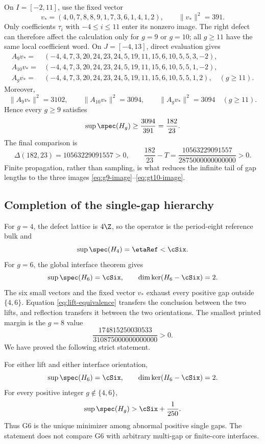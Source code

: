 On \(I=[-2,11]\), use the fixed vector
\begin{equation}
 v_*=(4,0,7,8,8,9,1,7,3,6,1,4,1,2),
 \qquad \|v_*\|^2=391.
 \label{eq:vstar}
\end{equation}
Only coefficients \(\tau_i\) with \(-4\leq i\leq11\) enter its nonzero
image.  The right defect can therefore affect the calculation only for
\(g=9\) or \(g=10\); all \(g\geq11\) have the same local coefficient word.
On \(J=[-4,13]\), direct evaluation gives
\begin{align}
 A_9v_*={}&(-4,4,7,3,20,24,23,24,5,19,11,15,6,10,5,5,3,-2),
 \label{eq:g9-image}\\
 A_{10}v_*={}&(-4,4,7,3,20,24,23,24,5,19,11,15,6,10,5,5,1,-2),
 \label{eq:g10-image}\\
 A_gv_*={}&(-4,4,7,3,20,24,23,24,5,19,11,15,6,10,5,5,1,2),
 \quad(g\geq11). \label{eq:gt10-image}
\end{align}
Moreover,
\[
\|A_9v_*\|^2=3102,\qquad
\|A_{10}v_*\|^2=3094,\qquad
\|A_gv_*\|^2=3094\quad(g\geq11).
\]
Hence every \(g\geq9\) satisfies
\begin{equation}
 \sup\spec(H_g)\geq\frac{3094}{391}=\frac{182}{23}.
\end{equation}
The final comparison is
\begin{equation}
 \Delta(182,23)=10563229091557>0,
 \qquad
 \frac{182}{23}-T=
 \frac{10563229091557}{2875000000000000}>0.
 \label{eq:tail-margin}
\end{equation}
Finite propagation, rather than sampling, is what reduces the infinite tail
of gap lengths to the three images \eqref{eq:g9-image}--\eqref{eq:gt10-image}.

\subsection{Completion of the single-gap hierarchy}

For \(g=4\), the defect lattice is \(4\Z\), so the operator is the
period-eight reference bulk and
\begin{equation}
 \sup\spec(H_4)=\etaRef<\cSix.
\end{equation}
For \(g=6\), the global interface theorem gives
\begin{equation}
 \sup\spec(H_6)=\cSix,\qquad
 \dim\ker(H_6-\cSix)=2.
\end{equation}
The six small vectors and the fixed vector \(v_*\) exhaust every positive
gap outside \(\{4,6\}\).  Equation \eqref{eq:lift-equivalence} transfers the
conclusion between the two lifts, and reflection transfers it between the
two orientations.  The smallest printed margin is the \(g=8\) value
\[
 \frac{174815250030533}{310875000000000000}>0.
\]
We have proved the following strict statement.

\begin{theorem}
\label{thm:single-gap}
For either lift and either interface orientation,
\[
 \sup\spec(H_6)=\cSix,\qquad
 \dim\ker(H_6-\cSix)=2.
\]
For every positive integer \(g\notin\{4,6\}\),
\[
 \sup\spec(H_g)>\cSix+\frac1{250}.
\]
Thus G6 is the unique minimizer among abnormal positive single gaps.  The
statement does not compare G6 with arbitrary multi-gap or finite-core
interfaces.
\end{theorem}
